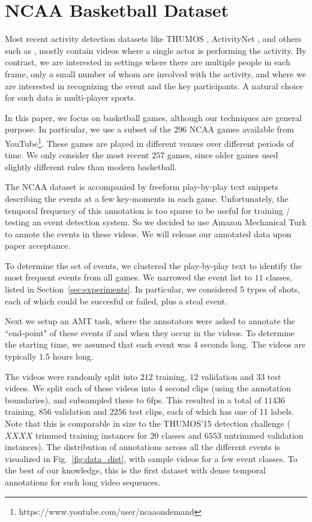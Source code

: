 
\section{NCAA Basketball Dataset}

Most recent activity detection datasets like THUMOS \cite{THUMOS},
ActivityNet \cite{ActivityNet}, and others such as
\cite{UCF101,Finegrained_cooking}, mostly contain videos where a single actor is performing the activity.
By contrast, we are interested in settings where there are multiple
people in each frame, only a small number of whom are involved with
the  activity, and where we are interested in recognizing the event
and the key participants.
A natural choice for such data is multi-player sports.

In this paper, we focus on basketball games, although our techniques
are general purpose.
In particular,  we use a subset of the $296$ NCAA games available from 
YouTube\footnote{https://www.youtube.com/user/ncaaondemand}.  These games are
played in different venues over different periods of time.
We only consider the most recent $257$ games, since older games used
slightly different rules than modern basketball.

The NCAA dataset is accompanied by freeform play-by-play text snippets describing the events
at a few key-moments in each game.
Unfortunately, the temporal frequency of this annotation is too sparse
to be useful for training / testing an event detection system.
So we decided to use Amazon Mechanical Turk to annote the events in
these videos. We will release our annotated data upon paper
acceptance.

To determine the set of events, 
we clustered the
play-by-play text to identify the most frequent events from all games. We
narrowed the event list to $11$ classes,
listed in Section~\ref{sec:experiments}.
In particular, we considered 
5 types of shots, each of which could be succesful or failed,
plus a steal event. 

Next we setup an AMT task, where the
annotators were asked to annotate the ``end-point" of these events if and when
they occur in the videos. 
To determine the starting time, we assumed that each event was 4
seconds long. 
The videos are typically $1.5$ hours long.

The videos were randomly split into $212$ training, $12$ validation and $33$
test videos. 
We split each of these videos into 4 second clips (using the
annotation boundaries), and subsampled these to 6fps.
This resulted in a total of $11436$ training, $856$ validation
and $2256$ test clips, each of which has one of 11 labels.
Note that this is comparable in size to the THUMOS'15 detection
challenge ($XXXX$ trimmed training instances for $20$ classes and $6553$
untrimmed validation instances). The distribution of annotations across all the
different events is visualized in Fig.~\ref{fig:data_dist}, with sample videos
for a few event classes. To the best of our
knowledge, this is the first dataset with dense temporal annotations for
such long video sequences.
